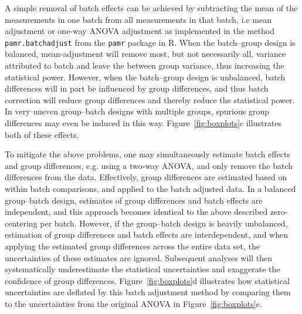 \documentclass[oupdraft]{bio}
\begin{document}
A simple removal of batch effects can be achieved by subtracting the mean of the measurements in one batch from all measurements in that batch, i.e mean adjustment or one-way ANOVA adjustment as implemented in the method \texttt{pamr.batchadjust} from the \texttt{pamr} package in R. When the batch--group design is balanced, mean-adjustment will remove most, but not necessarily all, variance attributed to batch and leave the between group variance, thus increasing the statistical power. However, when the batch--group design is unbalanced, batch differences will in part be influenced by group differences, and thus batch correction will reduce group differences and thereby reduce the statistical power. In very uneven group--batch designs with multiple groups, spurious group differences may even be induced in this way. Figure~\ref{fig:boxplots}c illustrates both of these effects.

To mitigate the above problems, one may simultaneously estimate batch effects and group differences, e.g. using a two-way ANOVA, and only remove the batch differences from the data. Effectively, group differences are estimated based on within batch comparisons, and applied to the batch adjusted data. In a balanced group--batch design, estimates of group differences and batch effects are independent, and this approach becomes identical to the above described zero-centering per batch. However, if the group--batch design is heavily unbalanced, estimation of group differences and batch effects are interdependent, and when applying the estimated group differences across the entire data set, the uncertainties of these estimates are ignored. Subsequent analyses will then systematically underestimate the statistical uncertainties and exaggerate the confidence of group differences. Figure~\ref{fig:boxplots}d illustrates how statistical uncertainties are deflated by this batch adjustment method by comparing them to the uncertainties from the original ANOVA in Figure~\ref{fig:boxplots}e.
\end{document}
